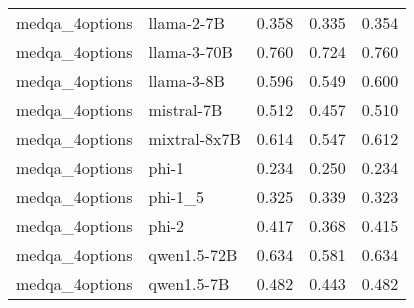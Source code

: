 \begin{tabular}{llrrr}
medqa_4options & llama-2-7B & 0.358 & 0.335 & 0.354 \\
medqa_4options & llama-3-70B & 0.760 & 0.724 & 0.760 \\
medqa_4options & llama-3-8B & 0.596 & 0.549 & 0.600 \\
medqa_4options & mistral-7B & 0.512 & 0.457 & 0.510 \\
medqa_4options & mixtral-8x7B & 0.614 & 0.547 & 0.612 \\
medqa_4options & phi-1 & 0.234 & 0.250 & 0.234 \\
medqa_4options & phi-1_5 & 0.325 & 0.339 & 0.323 \\
medqa_4options & phi-2 & 0.417 & 0.368 & 0.415 \\
medqa_4options & qwen1.5-72B & 0.634 & 0.581 & 0.634 \\
medqa_4options & qwen1.5-7B & 0.482 & 0.443 & 0.482 \\
\bottomrule
\end{tabular}
